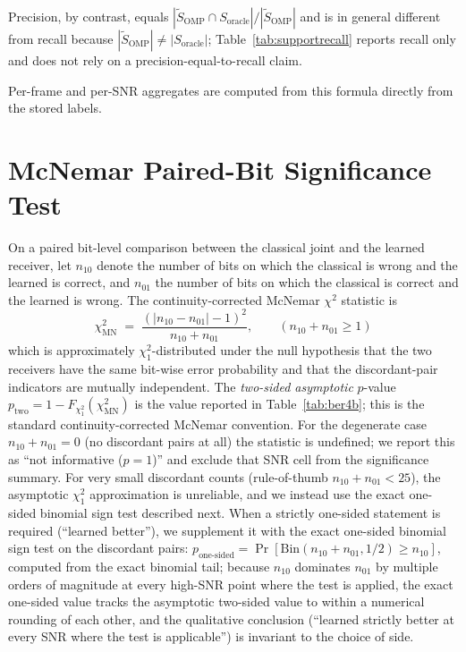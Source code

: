 Precision, by contrast, equals $|\tilde{S}_{\text{OMP}} \cap S_{\text{oracle}}| / |\tilde{S}_{\text{OMP}}|$ and is in general different from recall because $|\tilde{S}_{\text{OMP}}| \neq |S_{\text{oracle}}|$; Table~\ref{tab:supportrecall} reports recall only and does not rely on a precision-equal-to-recall claim.

Per-frame and per-SNR aggregates are computed from this formula directly
from the stored labels.

\section{McNemar Paired-Bit Significance Test}
\label{app:mcnemar}

On a paired bit-level comparison between the classical joint and the learned receiver, let $n_{10}$ denote the number of bits on which the classical is wrong and the learned is correct, and $n_{01}$ the number of bits on which the classical is correct and the learned is wrong.
The continuity-corrected McNemar $\chi^2$ statistic is
\begin{equation*}
\chi^2_\text{MN} \;=\; \frac{(|n_{10} - n_{01}| - 1)^2}{n_{10} + n_{01}}, \qquad (n_{10} + n_{01} \geq 1)
\end{equation*}
which is approximately $\chi^2_1$-distributed under the null hypothesis that the two receivers have the same bit-wise error probability and that the discordant-pair indicators are mutually independent.
The \emph{two-sided asymptotic} $p$-value $p_\text{two} = 1 - F_{\chi^2_1}(\chi^2_\text{MN})$ is the value reported in Table~\ref{tab:ber4b}; this is the standard continuity-corrected McNemar convention.
For the degenerate case $n_{10} + n_{01} = 0$ (no discordant pairs at all) the statistic is undefined; we report this as ``not informative ($p = 1$)'' and exclude that SNR cell from the significance summary.
For very small discordant counts (rule-of-thumb $n_{10} + n_{01} < 25$), the asymptotic $\chi^2_1$ approximation is unreliable, and we instead use the exact one-sided binomial sign test described next.
When a strictly one-sided statement is required (``learned better''), we supplement it with the exact one-sided binomial sign test on the discordant pairs: $p_\text{one-sided} = \Pr[\text{Bin}(n_{10} + n_{01}, 1/2) \geq n_{10}]$, computed from the exact binomial tail; because $n_{10}$ dominates $n_{01}$ by multiple orders of magnitude at every high-SNR point where the test is applied, the exact one-sided value tracks the asymptotic two-sided value to within a numerical rounding of each other, and the qualitative conclusion (``learned strictly better at every SNR where the test is applicable'') is invariant to the choice of side.

